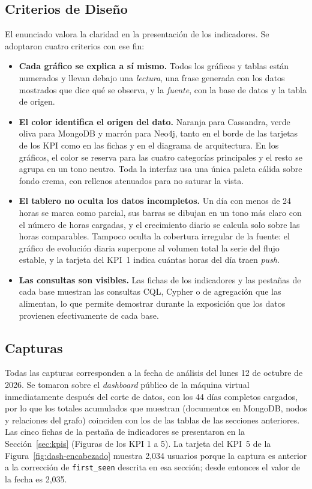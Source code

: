 \subsection{Criterios de Diseño}

El enunciado valora la claridad en la presentación de los indicadores. Se adoptaron cuatro criterios con ese fin:

\begin{itemize}[leftmargin=*]
    \item \textbf{Cada gráfico se explica a sí mismo.} Todos los gráficos y tablas están numerados y llevan debajo una \textit{lectura}, una frase generada con los datos mostrados que dice qué se observa, y la \textit{fuente}, con la base de datos y la tabla de origen.
    \item \textbf{El color identifica el origen del dato.} Naranja para Cassandra, verde oliva para MongoDB y marrón para Neo4j, tanto en el borde de las tarjetas de los KPI como en las fichas y en el diagrama de arquitectura. En los gráficos, el color se reserva para las cuatro categorías principales y el resto se agrupa en un tono neutro. Toda la interfaz usa una única paleta cálida sobre fondo crema, con rellenos atenuados para no saturar la vista.
    \item \textbf{El tablero no oculta los datos incompletos.} Un día con menos de 24 horas se marca como parcial, sus barras se dibujan en un tono más claro con el número de horas cargadas, y el crecimiento diario se calcula solo sobre las horas comparables. Tampoco oculta la cobertura irregular de la fuente: el gráfico de evolución diaria superpone al volumen total la serie del flujo estable, y la tarjeta del KPI~1 indica cuántas horas del día traen \textit{push}.
    \item \textbf{Las consultas son visibles.} Las fichas de los indicadores y las pestañas de cada base muestran las consultas CQL, Cypher o de agregación que las alimentan, lo que permite demostrar durante la exposición que los datos provienen efectivamente de cada base.
\end{itemize}

\subsection{Capturas}

Todas las capturas corresponden a la fecha de análisis del lunes 12 de octubre de 2026. Se tomaron sobre el \textit{dashboard} público de la máquina virtual inmediatamente después del corte de datos, con los 44 días completos cargados, por lo que los totales acumulados que muestran (documentos en MongoDB, nodos y relaciones del grafo) coinciden con los de las tablas de las secciones anteriores. Las cinco fichas de la pestaña de indicadores se presentaron en la Sección~\ref{sec:kpis} (Figuras de los KPI 1 a 5). La tarjeta del KPI~5 de la Figura~\ref{fig:dash-encabezado} muestra 2,034 usuarios porque la captura es anterior a la corrección de \texttt{first\_seen} descrita en esa sección; desde entonces el valor de la fecha es 2,035.

